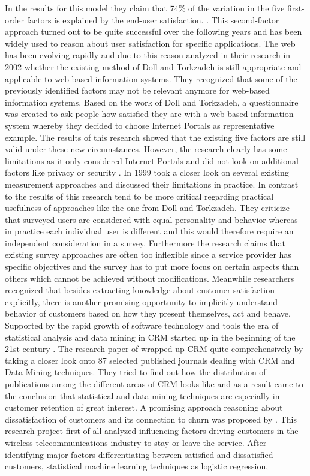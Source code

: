 In the results for this model they claim that 74\% of the variation in the five first-order factors is explained by the end-user satisfaction. \cite{doll1994confirmatory}. This second-factor approach turned out to be quite successful over the following years and has been widely used to reason about user satisfaction for specific applications. The web has been evolving rapidly and due to this reason \cite{xiao2002measurement} analyzed in their research in 2002 whether the existing method of Doll and Torkzadeh is still appropriate and applicable to web-based information systems. They recognized that some of the previously identified factors may not be relevant anymore for web-based information systems. Based on the work of Doll and Torkzadeh, a questionnaire was created to ask people how satisfied they are with a web based information system whereby they decided to choose Internet Portals as representative example. The results of this research showed that the existing five factors are still valid under these new circumstances. However, the research clearly has some limitations as it only considered Internet Portals and did not look on additional factors like privacy or security \cite{xiao2002measurement}. In 1999 \cite{roy1998developing} took a closer look on several existing measurement approaches and discussed their limitations in practice. In contrast to \cite{xiao2002measurement} the results of this research tend to be more critical regarding practical usefulness of approaches like the one from Doll and Torkzadeh. They criticize that surveyed users are considered with equal personality and behavior whereas in practice each individual user is different and this would therefore require an independent consideration in a survey. Furthermore the research claims that existing survey approaches are often too inflexible since a service provider has specific objectives and the survey has to put more focus on certain aspects than others which cannot be achieved without modifications. Meanwhile researchers recognized that besides extracting knowledge about customer satisfaction explicitly, there is another promising opportunity to implicitly understand behavior of customers based on how they present themselves, act and behave. Supported by the rapid growth of software technology and tools the era of statistical analysis and data mining in CRM started up in the beginning of the 21st century \cite{Ngai2009} \cite{neckel2015}. The research paper of \cite{Ngai2009} wrapped up CRM quite comprehensively by taking a closer look onto 87 selected published journals dealing with CRM and Data Mining techniques. They tried to find out how the distribution of publications among the different areas of CRM looks like and as a result came to the conclusion that statistical and data mining techniques are especially in customer retention of great interest. A promising approach reasoning about dissatisfaction of customers and its connection to churn was proposed by \cite{mozer2000predicting}. This research project first of all analyzed influencing factors driving customers in the wireless telecommunications industry to stay or leave the service. After identifying major factors differentiating between satisfied and dissatisfied customers, statistical machine learning techniques as logistic regression, 